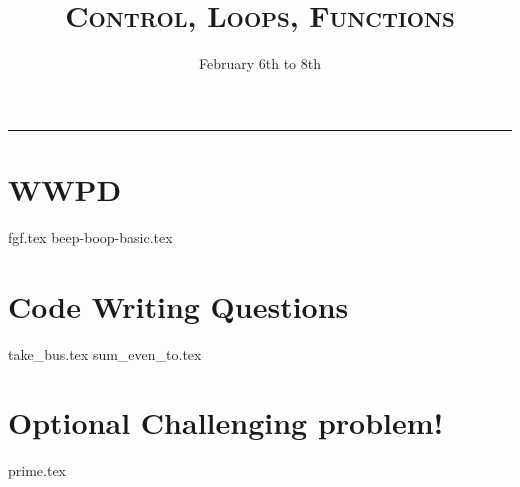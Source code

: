 \documentclass{exam}
\title{\textsc{Control, Loops, Functions}}
\date{February 6th to 8th}
\begin{document}
\maketitle
\rule{\textwidth}{0.15em}
\fontsize{12}{15}\selectfont


\section{WWPD}
\begin{questions}
{fgf.tex}
\newpage
{beep-boop-basic.tex}
\end{questions}

\newpage
\section{Code Writing Questions}
\begin{questions}
{take_bus.tex}
{sum_even_to.tex}
\newpage
\section{Optional Challenging problem!}
{prime.tex}

\end{questions}
\end{document}
